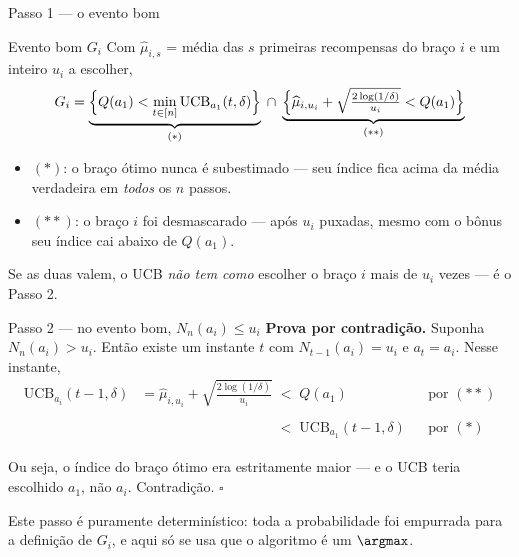 \documentclass[aspectratio=169, 11pt]{beamer}
\newcommand{\muh}{\widehat{\mu}}
\newcommand{\ucb}{\mathrm{UCB}}
\begin{document}
\begin{frame}{Passo 1 --- o evento bom}
  \begin{defbox}{Evento bom $G_i$}
    Com $\muh_{i,s}$ = média das $s$ primeiras recompensas do braço $i$ e um
    inteiro $u_i$ a escolher,
    \[
      G_i =
      \underbrace{\Bigl\{ Q(a_1) < \min_{t\in[n]} \ucb_{a_1}(t,\delta)\Bigr\}}_{(*)}
      \;\cap\;
      \underbrace{\Bigl\{ \muh_{i,u_i} + \sqrt{\tfrac{2\log(1/\delta)}{u_i}} < Q(a_1)\Bigr\}}_{(**)}
    \]
  \end{defbox}

  {\small
  \begin{itemize}\setlength{\itemsep}{0.2ex}
    \item $(*)$: \alert{o braço ótimo nunca é subestimado} --- seu índice fica
          acima da média verdadeira em \emph{todos} os $n$ passos.
    \item $(**)$: \alert{o braço $i$ foi desmascarado} --- após $u_i$ puxadas,
          mesmo com o bônus seu índice cai abaixo de $Q(a_1)$.
  \end{itemize}}

  \vspace{-0.4em}
  \begin{ideiabox}
    Se as duas valem, o UCB \emph{não tem como} escolher o braço $i$ mais de
    $u_i$ vezes --- é o Passo 2.
  \end{ideiabox}
\end{frame}

\begin{frame}{Passo 2 --- no evento bom, $N_n(a_i)\le u_i$}
  \textbf{Prova por contradição.} Suponha $N_n(a_i)>u_i$. Então existe um
  instante $t$ com $N_{t-1}(a_i)=u_i$ e $a_t=a_i$. Nesse instante,
  \begin{align*}
    \ucb_{a_i}(t-1,\delta)
      &= \muh_{i,u_i} + \sqrt{\tfrac{2\log(1/\delta)}{u_i}}
       \;<\; Q(a_1) &&\text{por } (**)\\[-0.1em]
      &\phantom{= \muh_{i,u_i} + \sqrt{\tfrac{2\log(1/\delta)}{u_i}}\;}
       <\; \ucb_{a_1}(t-1,\delta) &&\text{por } (*)
  \end{align*}
  \vspace{-0.6em}

  Ou seja, o índice do braço ótimo era estritamente maior --- e o UCB teria
  escolhido $a_1$, não $a_i$. Contradição. \hfill$\square$

  \begin{ideiabox}
    Este passo é \alert{puramente determinístico}: toda a probabilidade foi
    empurrada para a definição de $G_i$, e aqui só se usa que o algoritmo é um
    $\argmax$.
  \end{ideiabox}
\end{frame}
\end{document}
